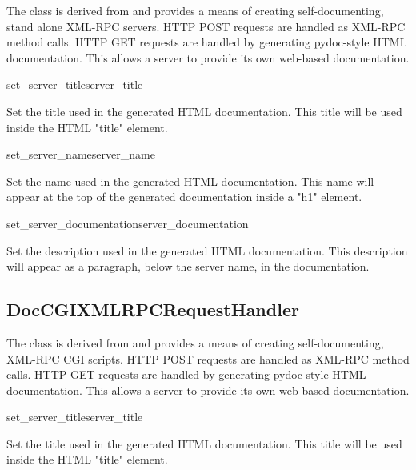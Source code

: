 The  class is derived from
 and provides a means of
creating self-documenting, stand alone XML-RPC servers. HTTP POST
requests are handled as XML-RPC method calls. HTTP GET requests are
handled by generating pydoc-style HTML documentation. This allows a
server to provide its own web-based documentation.

\begin{methoddesc}[DocXMLRPCServer]{set_server_title}{server_title}

Set the title used in the generated HTML documentation. This title
will be used inside the HTML "title" element.

\end{methoddesc}

\begin{methoddesc}[DocXMLRPCServer]{set_server_name}{server_name}

Set the name used in the generated HTML documentation. This name will
appear at the top of the generated documentation inside a "h1"
element.

\end{methoddesc}


\begin{methoddesc}[DocXMLRPCServer]{set_server_documentation}{server_documentation}

Set the description used in the generated HTML documentation. This
description will appear as a paragraph, below the server name, in the
documentation.

\end{methoddesc}

\subsection{DocCGIXMLRPCRequestHandler}

The  class is derived from
 and provides a means
of creating self-documenting, XML-RPC CGI scripts. HTTP POST requests
are handled as XML-RPC method calls. HTTP GET requests are handled by
generating pydoc-style HTML documentation. This allows a server to
provide its own web-based documentation.

\begin{methoddesc}[DocCGIXMLRPCRequestHandler]{set_server_title}{server_title}

Set the title used in the generated HTML documentation. This title
will be used inside the HTML "title" element.

\end{methoddesc}


